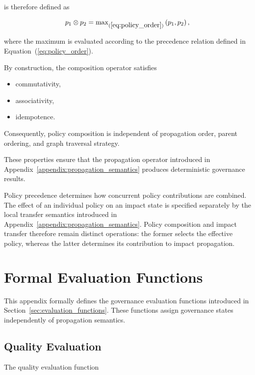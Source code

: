 \documentclass[10pt]{article}
\begin{document}
	is therefore defined as
	
	\begin{equation}
		p_1\otimes p_2
		=
		\max\nolimits_{(\ref{eq:policy_order})}
		\left(p_1,p_2\right),
		\label{eq:policy_max}
	\end{equation}
	
	where the maximum is evaluated according to the precedence relation defined in Equation~(\ref{eq:policy_order}).
	
	By construction, the composition operator satisfies
	
	\begin{itemize}
		\item commutativity,
		\item associativity,
		\item idempotence.
	\end{itemize}
	
	Consequently, policy composition is independent of propagation order, parent ordering, and graph traversal strategy.
	
	These properties ensure that the propagation operator introduced in Appendix~\ref{appendix:propagation_semantics} produces deterministic governance results.
	
	Policy precedence determines how concurrent policy contributions are combined.
	The effect of an individual policy on an impact state is specified separately
	by the local transfer semantics introduced in
	Appendix~\ref{appendix:propagation_semantics}. Policy composition and impact
	transfer therefore remain distinct operations: the former selects the effective
	policy, whereas the latter determines its contribution to impact propagation.
	
	\section{Formal Evaluation Functions}
	\label{appendix:evaluation_functions}
	
	This appendix formally defines the governance evaluation functions introduced in Section~\ref{sec:evaluation_functions}. These functions assign governance states independently of propagation semantics.
	
	\subsection{Quality Evaluation}
	
	The quality evaluation function
	
\end{document}
